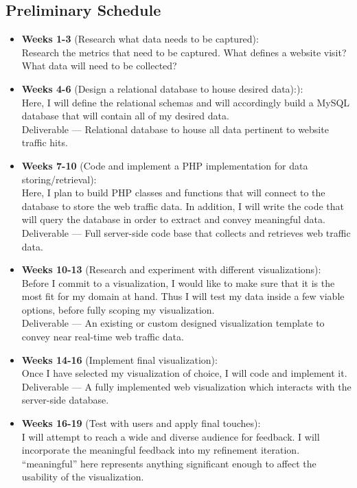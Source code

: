 \documentclass[12pt]{article}
\begin{document}

\subsection{Preliminary Schedule}
\begin{itemize}
\item[] \textbf{Weeks 1-3} (Research what data needs to be captured): \\
Research the metrics that need to be captured. What defines a website visit? What data will need to be collected?

\item[] \textbf{Weeks 4-6} (Design a relational database to house desired data):): \\
Here, I will define the relational schemas and will accordingly build a MySQL database that will contain all of my desired data. \\
Deliverable --- Relational database to house all data pertinent to website traffic hits.

\item[] \textbf{Weeks 7-10} (Code and implement a PHP implementation for data storing/retrieval): \\
Here, I plan to build PHP classes and functions that will connect to the database to store the web traffic data. In addition, I will write the code that will query the database in order to extract and convey meaningful data. \\
Deliverable --- Full server-side code base that collects and retrieves web traffic data.

\item[] \textbf{Weeks 10-13} (Research and experiment with different visualizations): \\
Before I commit to a visualization, I would like to make sure that it is the most fit for my domain at hand. Thus I will test my data inside a few viable options, before fully scoping my visualization. \\
Deliverable --- An existing or custom designed visualization template to convey near real-time web traffic data.

\item[] \textbf{Weeks 14-16} (Implement final visualization): \\
Once I have selected my visualization of choice, I will code and implement it. \\
Deliverable --- A fully implemented web visualization which interacts with the server-side database.

\item[] \textbf{Weeks 16-19} (Test with users and apply final touches): \\
I will attempt to reach a wide and diverse audience for feedback. I will incorporate the meaningful feedback into my refinement iteration. “meaningful” here represents anything significant enough to affect the usability of the visualization.

\end{itemize}
\end{document}

